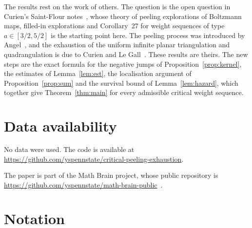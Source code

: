 \documentclass[11pt]{amsart}
\theoremstyle{remark}
\numberwithin{equation}{section}
\newcommand{\1}{\mathbf 1}
\begin{document}
The results rest on the work of others. The question is the open question in Curien's Saint-Flour notes~\cite{Cur}, whose theory of peeling explorations of Boltzmann maps, filled-in explorations and Corollary~27 for weight sequences of type $a\in[3/2,5/2]$ is the starting point here. The peeling process was introduced by Angel~\cite{Ang}, and the exhaustion of the uniform infinite planar triangulation and quadrangulation is due to Curien and Le Gall~\cite{CLG}. These results are theirs. The new steps are the exact formula for the negative jumps of Proposition~\ref{prop:kernel}, the estimates of Lemma~\ref{lem:est}, the localisation argument of Proposition~\ref{prop:sum} and the survival bound of Lemma~\ref{lem:hazard}, which together give Theorem~\ref{thm:main} for every admissible critical weight sequence.

\section*{Data availability}
No data were used. The code is available at\\ \url{https://github.com/yspennstate/critical-peeling-exhaustion}.

The paper is part of the Math Brain project, whose public repository is \url{https://github.com/yspennstate/math-brain-public}~\cite{MathBrainRepo}.

\appendix
\section{Notation}\label{app:notation}
\end{document}
